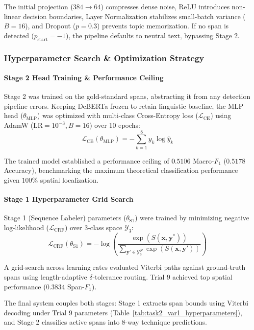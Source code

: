 \documentclass[12pt, a4paper]{article}
\begin{document}
The initial projection ($384 \rightarrow 64$) compresses dense noise, ReLU introduces non-linear decision boundaries, Layer Normalization stabilizes small-batch variance ($B=16$), and Dropout ($p=0.3$) prevents topic memorization. If no span is detected ($p_{\text{start}} = -1$), the pipeline defaults to neutral text, bypassing Stage 2.


\subsubsection{Hyperparameter Search \& Optimization Strategy}
\label{subsubsec:task2_var1_hyperparameters}

\paragraph{Stage 2 Head Training \& Performance Ceiling}
Stage 2 was trained on the gold-standard spans, abstracting it from any detection pipeline errors. Keeping DeBERTa frozen to retain linguistic baseline, the MLP head ($\theta_{\text{MLP}}$) was optimized with multi-class Cross-Entropy loss ($\mathcal{L}_{\text{CE}}$) using AdamW ($\text{LR} = 10^{-3}, B = 16$) over 10 epochs:
\[
\mathcal{L}_{\text{CE}}(\theta_{\text{MLP}}) = -\sum_{k=1}^{8} y_{k} \log \hat{y}_{k}
\]

The trained model established a performance ceiling of $0.5106$ Macro-$F_1$ ($0.5178$ Accuracy), benchmarking the maximum theoretical classification performance given $100\%$ spatial localization.

\paragraph{Stage 1 Hyperparameter Grid Search}
Stage 1 (Sequence Labeler) parameters ($\theta_{\text{S1}}$) were trained by minimizing negative log-likelihood ($\mathcal{L}_{\text{CRF}}$) over 3-class space $\mathcal{Y}_3$:
\[
\mathcal{L}_{\text{CRF}}(\theta_{\text{S1}}) = -\log \left( \frac{\exp(S(\mathbf{x}, \mathbf{y}^*))}{\sum_{\mathbf{y}' \in \mathcal{Y}_3^{N}} \exp(S(\mathbf{x}, \mathbf{y}'))} \right)
\]

A grid-search across learning rates evaluated Viterbi paths against ground-truth spans using length-adaptive $\delta$-tolerance routing. Trial 9 achieved top spatial performance ($0.3834$ Span-$F_1$).

The final system couples both stages: Stage 1 extracts span bounds using Viterbi decoding under Trial 9 parameters (Table~\ref{tab:task2_var1_hyperparameters}), and Stage 2 classifies active spans into 8-way technique predictions.
\end{document}
